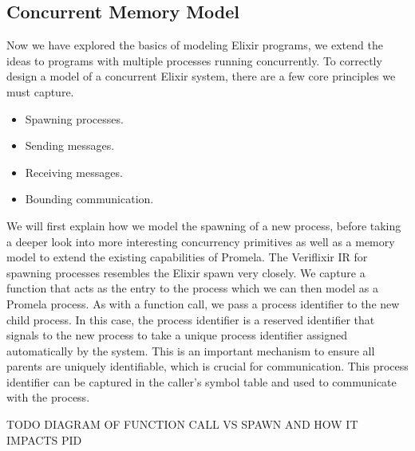 \subsection{Concurrent Memory Model} \label{sec:memory_model}
Now we have explored the basics of modeling Elixir programs, we extend the ideas to programs with multiple processes running concurrently. To correctly design a model of a concurrent Elixir system, there are a few core principles we must capture.
\begin{itemize}
    \item Spawning processes.
    \item Sending messages.
    \item Receiving messages.
    \item Bounding communication.
\end{itemize}
We will first explain how we model the spawning of a new process, before taking a deeper look into more interesting concurrency primitives as well as a memory model to extend the existing capabilities of Promela. The Veriflixir IR for spawning processes resembles the Elixir spawn very closely. We capture a function that acts as the entry to the process which we can then model as a Promela process. As with a function call, we pass a process identifier to the new child process. In this case, the process identifier is a reserved identifier that signals to the new process to take a unique process identifier assigned automatically by the system. This is an important mechanism to ensure all parents are uniquely identifiable, which is crucial for communication. This process identifier can be captured in the caller's symbol table and used to communicate with the process.
\par
TODO DIAGRAM OF FUNCTION CALL VS SPAWN AND HOW IT IMPACTS PID
\par

